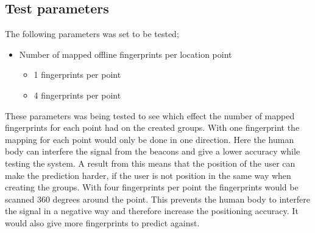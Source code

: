 \newpage

\subsection{Test parameters}\label{sec:methodTestParameters}
The following parameters was set to be tested;

\begin{itemize}
\item Number of mapped offline fingerprints per location point
	\begin{itemize}
		\item 1 fingerprints per point
		\item 4 fingerprints per point
	\end{itemize}
\end{itemize}

These parameters was being tested to see which effect the number of mapped fingerprints for each point had on the created groups.
With one fingerprint the mapping for each point would only be done in one direction.
Here the human body can interfere the signal from the beacons and give a lower accuracy while testing the system.
A result from this means that the position of the user can make the prediction harder, if the user is not position in the same way when creating the groups.
With four fingerprints per point the fingerprints would be scanned 360 degrees around the point. 
This prevents the human body to interfere the signal in a negative way and therefore increase the positioning accuracy.
It would also give more fingerprints to predict against.
